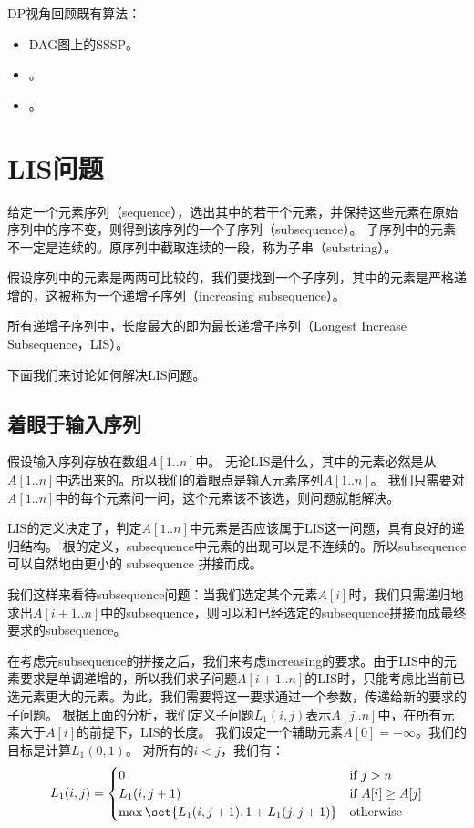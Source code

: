 \nin DP视角回顾既有算法：
\begin{itemize}
    \item DAG图上的SSSP。
    \item {}。
    \item {}。
\end{itemize}


\section{LIS问题} \label{Sec:LIS}

给定一个元素序列（sequence），选出其中的若干个元素，并保持这些元素在原始序列中的序不变，则得到该序列的一个子序列（subsequence）。
子序列中的元素不一定是连续的。原序列中截取连续的一段，称为子串（substring）。

假设序列中的元素是两两可比较的，我们要找到一个子序列，其中的元素是严格递增的，这被称为一个递增子序列（increasing subsequence）。

所有递增子序列中，长度最大的即为最长递增子序列（Longest Increase Subsequence，LIS）。

下面我们来讨论如何解决LIS问题。

\subsection{着眼于输入序列}

假设输入序列存放在数组$A[1..n]$中。
无论LIS是什么，其中的元素必然是从$A[1..n]$中选出来的。所以我们的着眼点是输入元素序列$A[1..n]$。
我们只需要对$A[1..n]$中的每个元素问一问，这个元素该不该选，则问题就能解决。

LIS的定义决定了，判定$A[1..n]$中元素是否应该属于LIS这一问题，具有良好的递归结构。
根的定义，subsequence中元素的出现可以是不连续的。所以subsequence可以自然地由更小的 subsequence 拼接而成。

我们这样来看待subsequence问题：当我们选定某个元素$A[i]$时，我们只需递归地求出$A[i+1..n]$中的subsequence，则可以和已经选定的subsequence拼接而成最终要求的subsequence。

在考虑完subsequence的拼接之后，我们来考虑increasing的要求。由于LIS中的元素要求是单调递增的，所以我们求子问题$A[i+1..n]$的LIS时，只能考虑比当前已选元素更大的元素。为此，我们需要将这一要求通过一个参数，传递给新的要求的子问题。
根据上面的分析，我们定义子问题$L_1(i,j)$表示$A[j..n]$中，在所有元素大于$A[i]$的前提下，LIS的长度。
我们设定一个辅助元素$A[0] = -\infty$。我们的目标是计算$L_1(0,1)$。
对所有的$i<j$，我们有：
\begin{align}
    L_1(i,j) = \begin{cases}
        0 & \text{if } j>n \\
        L_1(i,j+1) & \text{if } A[i] \geq A[j] \\
        \max\set{L_1(i,j+1), 1+L_1(j,j+1)} & \text{otherwise}    
    \end{cases} 
\end{align}


